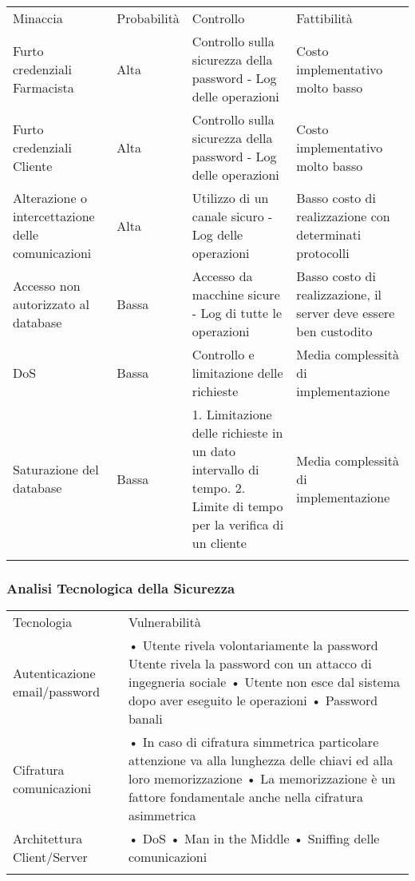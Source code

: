 \begin{longtable}[c]{@{}llll@{}}
\toprule\addlinespace
Minaccia & Probabilità & Controllo & Fattibilità
\\\addlinespace
\midrule\endhead
Furto credenziali Farmacista & Alta & Controllo sulla sicurezza della
password - Log delle operazioni & Costo implementativo molto basso
\\\addlinespace
Furto credenziali Cliente & Alta & Controllo sulla sicurezza della
password - Log delle operazioni & Costo implementativo molto basso
\\\addlinespace
Alterazione o intercettazione delle comunicazioni & Alta & Utilizzo di
un canale sicuro - Log delle operazioni & Basso costo di realizzazione
con determinati protocolli
\\\addlinespace
Accesso non autorizzato al database & Bassa & Accesso da macchine sicure
- Log di tutte le operazioni & Basso costo di realizzazione, il server
deve essere ben custodito
\\\addlinespace
DoS & Bassa & Controllo e limitazione delle richieste & Media
complessità di implementazione
\\\addlinespace
Saturazione del database & Bassa & 1. Limitazione delle richieste in un
dato intervallo di tempo. 2. Limite di tempo per la verifica di un
cliente & Media complessità di implementazione
\\\addlinespace
\bottomrule
\end{longtable}

\subsubsection{Analisi Tecnologica della
Sicurezza}\label{analisi-tecnologica-della-sicurezza}

\begin{longtable}[c]{@{}ll@{}}
\toprule\addlinespace
Tecnologia & Vulnerabilità
\\\addlinespace
\midrule\endhead
Autenticazione email/password & • Utente rivela volontariamente la
password Utente rivela la password con un attacco di ingegneria sociale
• Utente non esce dal sistema dopo aver eseguito le operazioni •
Password banali
\\\addlinespace
Cifratura comunicazioni & • In caso di cifratura simmetrica particolare
attenzione va alla lunghezza delle chiavi ed alla loro memorizzazione •
La memorizzazione è un fattore fondamentale anche nella cifratura
asimmetrica
\\\addlinespace
Architettura Client/Server & • DoS • Man in the Middle • Sniffing delle
comunicazioni
\\\addlinespace
\bottomrule
\end{longtable}

